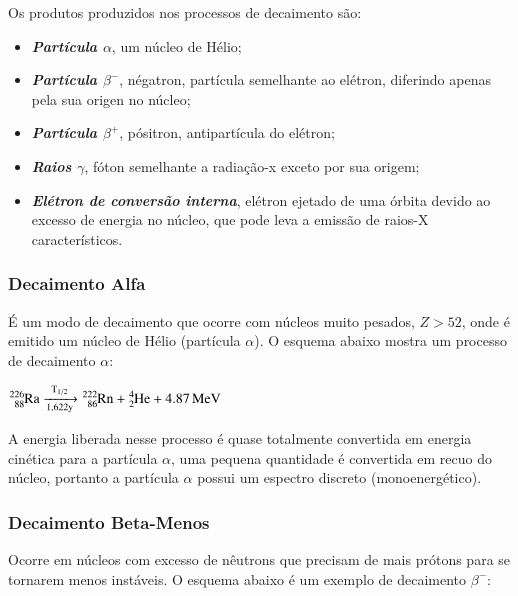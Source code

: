 \documentclass[11pt,a4paper]{article}
\newcounter{exemplo}
\begin{document}
    Os produtos produzidos nos processos de decaimento são:

            \begin{itemize}
                \item \textbf{\textit{\textcolor{CarnationPink}{Partícula $\alpha$}}}, um núcleo de Hélio;
                \item \textbf{\textit{\textcolor{CarnationPink}{Partícula $\beta^-$}}}, négatron, partícula semelhante ao elétron, diferindo apenas pela sua origen no núcleo;
                \item \textbf{\textit{\textcolor{CarnationPink}{Partícula $\beta^+$}}}, pósitron, antipartícula do elétron;
                \item \textbf{\textit{\textcolor{CarnationPink}{Raios $\gamma$}}}, fóton semelhante a radiação-x exceto por sua origem;
                \item \textbf{\textit{\textcolor{CarnationPink}{Elétron de conversão interna}}}, elétron ejetado de uma órbita devido ao excesso de energia no núcleo, que pode leva a emissão de raios-X característicos.
            \end{itemize}
        
\subsubsection*{Decaimento Alfa}

    É um modo de decaimento que ocorre com núcleos muito pesados, $Z > 52$, onde é emitido um núcleo de Hélio (partícula $\alpha$). O esquema abaixo mostra um processo de decaimento $\alpha$:

                \begin{center}
                    $\ce{^{226}_{88}Ra ->[{T_{1/2}}][{1,622y}] ^{222}_{86}Rn + ^{4}_{2}He + 4.87 MeV}$
                \end{center}

    A energia liberada nesse processo é quase totalmente convertida em energia cinética para a partícula $\alpha$, uma pequena quantidade é convertida em recuo do núcleo, portanto a partícula $\alpha$ possui um espectro discreto (monoenergético). 
            

\subsubsection*{Decaimento Beta-Menos}

    Ocorre em núcleos com excesso de nêutrons que precisam de mais prótons para se tornarem menos instáveis. O esquema abaixo é um exemplo de decaimento $\beta^-$:
\end{document}
